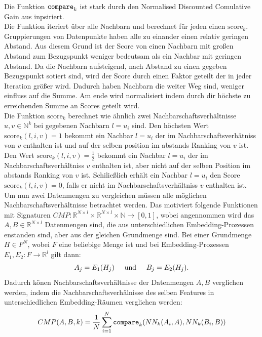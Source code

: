 \documentclass[12pt,letterpaper,ngerman]{article}
\begin{document}
Die Funktion $\verb|compare|_k$ ist stark durch den Normalised Discounted Comulative Gain
aus \cite{ndcg} inpsiriert.\\
Die Funktion iteriert über alle Nachbarn und berechnet
für jeden einen $\text{score}_k$. Gruppierungen von Datenpunkte haben
alle zu einander einen relativ geringen Abstand. Aus diesem Grund ist
der Score von einen Nachbarn mit großen Abstand zum Bezugspunkt weniger
bedeutsam als ein Nachbar mit geringen Abstand. Da die Nachbarn aufsteigend,
nach Abstand zu einen gegeben Bezugspunkt sotiert sind, wird der Score
durch einen Faktor geteilt der in jeder Iteration größer wird. Dadurch
haben Nachbarn die weiter Weg sind, weniger einfluss auf die Summe.
Am ende wird normalisiert indem durch dir höchste zu erreichenden
Summe an Scores geteilt wird. \\
Die Funktion $\text{score}_k$ berechnet wie ähnlich zwei
Nachbarschaftsverhältnisse $u, v \in \mathbb{N}^k$ bei  gegebenen
Nachbarn $l = u_i$ sind. Den 
höchsten Wert $\text{score}_k(l, i, v) = 1$ bekommt ein 
Nachbar $l = u_i$ der im Nachbarschaftsverhätniss von $v$
enthalten ist und auf der selben position im abstands
Ranking von $v$ ist. Den Wert 
$\text{score}_k(l, i, v) = \frac{1}{2}$ bekommt ein 
Nachbar $l = u_i$ der im Nachbarschaftsverhältniss
$v$ enthalten ist, aber nicht auf 
der selben Position im abstands Ranking von $v$ ist.
Schiließlich erhält ein Nachbar $l = u_i$ den Score
$\text{score}_k(l, i, v) = 0$, falls er nicht 
im Nachbarschaftsverhältniss $v$ enthalten ist.\\
Um nun zwei Datenmengen zu vergleichen müssen alle 
möglichen Nachbarschaftsverhältnisse betrachtet 
werden. Das motiviert folgende Funktionen mit Signaturen
$CMP: \mathbb{R}^{N\times l} \times  \mathbb{R}^{N\times l} \times \mathbb{N} \to [0,1]$, 
wobei angennommen wird das $A,B \in \mathbb{R}^{N\times l}$ Datenmengen 
sind, die aus unterschiedlichen Embedding-Prozessen enstanden sind, aber 
aus der gleichen Grundmenge sind. Bei einer Grundmenge $H \in F^N$, wobei
$F$ eine beliebige Menge ist und bei Embedding-Prozessen $E_1,E_2: F \to \mathbb{R}^{l}$ 
gilt dann: \[A_j = E_1(H_j)  \hspace{0.5cm }\text{und} \hspace{0.5cm } B_j = E_2(H_j).\]
Dadurch könen Nachbarschaftsverhältnisse der Datenmengen $A,B$ verglichen werden,
indem die Nachbarschaftsverhälnisse des selben Features in unterschiedlichen
Embedding-Räumen verglichen werden:
\[
  CMP(A, B, k) = \frac{1}{N}\sum_{i = 1}^{N} \verb|compare|_k(NN_k(A_i,A),NN_k(B_i, B))
\]
\end{document}
